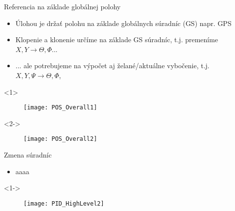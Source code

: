 %
%

  \begin{frame}[t]{Referencia na základe globálnej polohy}
\begin{itemize}
  \item<1-> Úlohou je držať polohu na základe globálnych súradníc (GS) napr. GPS
  \item<2-> Klopenie a klonenie určíme na základe GS súradníc, t.j. premeníme $X,Y\rightarrow\Theta,\Phi$...
    \item<3->  ...   ale potrebujeme na výpočet aj želané/aktuálne vybočenie, t.j. $X,Y,\Psi\rightarrow\Theta,\Phi$,
\end{itemize}
  \begin{onlyenv}<1>
  \begin{figure}
\centering
  \texttt{[image: POS\_Overall1]}\\
\end{figure}
\end{onlyenv}
  \begin{onlyenv}<2->
  \begin{figure}
\centering
  \texttt{[image: POS\_Overall2]}\\
\end{figure}
\end{onlyenv}

\end{frame}

  \begin{frame}[t]{Zmena súradníc}
\begin{itemize}
  \item<1-> aaaa
\end{itemize}

  \begin{onlyenv}<1->
  \begin{figure}
\centering
  \texttt{[image: PID\_HighLevel2]}\\
\end{figure}
\end{onlyenv}

  \end{frame}



